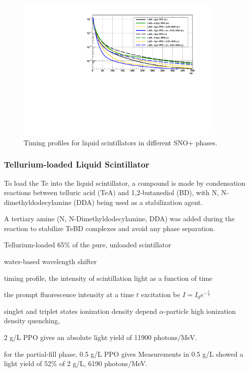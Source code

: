 \begin{figure}[!htb]
	\centering
	\includegraphics[width=10cm]{plotAllTiming.pdf}
	\caption{Timing profiles for liquid scintillators in different SNO+ phases.}
	\label{allTiming}
\end{figure}

\subsubsection{Tellurium-loaded Liquid Scintillator}\label{sect:TeLS_SNO+}

To load the Te into the liquid scintillator, a compound is made by 
condensation reactions between telluric acid (TeA) and 1,2-butanediol (BD), with N, N-dimethyldodecylamine (DDA) being used as a stabilization agent.

A tertiary amine (N, N-Dimethyldodecylamine, DDA) was added during the reaction to stabilize TeBD complexes and avoid any phase separation. 


Tellurium-loaded 65\% of the pure, unloaded scintillator



water-based wavelength shifter

timing profile, the intensity of scintillation light as a function of time

the prompt fluorescence intensity at a time $t$ excitation be $I=I_0e^{-\frac{t}{\tau}}$



singlet and triplet states 
ionization density 
depend
$\alpha$-particle
high ionization density 
quenching, 


2 g/L PPO gives an absolute light yield of 11900 photons/MeV.


for the partial-fill phase, 0.5 g/L PPO gives Measurements in 0.5 g/L showed a light yield of 52\% of 2 g/L,  
6190 photons/MeV\cite{tanner0p5,joshW1}.

